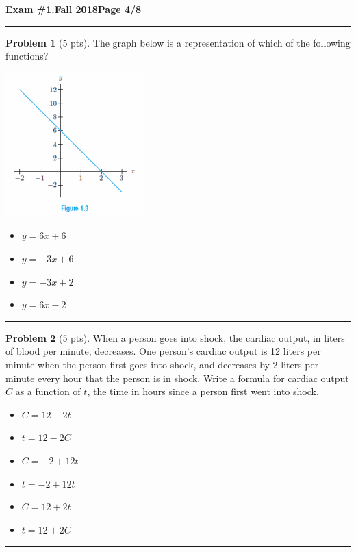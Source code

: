 \documentclass[12pt]{article}
\makeatletter
\theoremstyle{definition}
\newtheorem{problem}{Problem}
\newcommand*{\radiobutton}{%
  \@ifstar{\@radiobutton0}{\@radiobutton1}%
}
\newcommand*{\@radiobutton}[1]{%
  \begin{tikzpicture}
    \pgfmathsetlengthmacro\radius{height("X")/2}
    \draw[radius=\radius] circle;
    \ifcase#1 \fill[radius=.6*\radius] circle;\fi
  \end{tikzpicture}%
}
\makeatother
\begin{document}
\newpage

\hfill{\large\bf Exam \#1.}\hfill{\large\bf Fall 2018}\hfill{\large\bf Page 4/8}\hrule

\bigskip
\begin{problem}[5 pts]
  The graph below is a representation of which of the following functions?
  \begin{multicols}{2}
    \begin{center}
      \includegraphics{1graph2.png}
    \end{center}
    \begin{itemize}
    \item[\radiobutton] $y=6x+6$
    \item[\radiobutton] $y=-3x+6$
    \item[\radiobutton] $y=-3x+2$
    \item[\radiobutton] $y=6x-2$
    \end{itemize}
  \end{multicols}
\end{problem}
\hrule

\begin{problem}[5 pts]
  When a person goes into shock, the cardiac output, in liters of blood per minute, decreases. One person’s cardiac output
  is 12 liters per minute when the person first goes into shock, and decreases by 2 liters per minute every hour that the
  person is in shock. Write a formula for cardiac output $C$ as a function of $t$, the time in hours since a person first
  went into shock. 
  \begin{itemize}
  \item[\radiobutton] $C = 12 - 2t$
  \item[\radiobutton] $t = 12 - 2C$
  \item[\radiobutton] $C = -2 + 12t$
  \item[\radiobutton] $t = -2 + 12t$
  \item[\radiobutton] $C = 12 + 2t$
  \item[\radiobutton] $t = 12 + 2C$
  \end{itemize}
\end{problem}
\hrule
\end{document}
